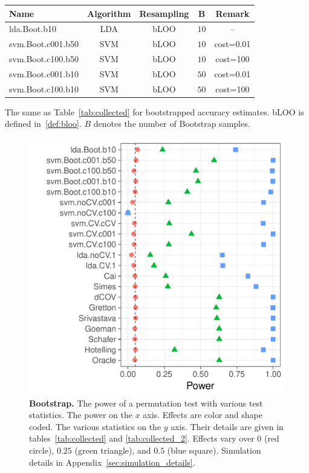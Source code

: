 \documentclass[onecolumn,draftclsnofoot]{IEEEtran}
\begin{document}
\begin{tcolorbox}
	\centering
	\footnotesize
	\begin{tabular}{l|c|c|c|c}
		Name & Algorithm & Resampling & B  & Remark\\ 
		\hline
		\hline
		lda.Boot.b10 & LDA & bLOO 	& $10$ &  -- \\ 
		svm.Boot.c001.b50 & SVM & bLOO 	& $10$ & cost=0.01 \\ 
		svm.Boot.c100.b50 & SVM & bLOO 	& $10$ & cost=100 \\ 
		svm.Boot.c001.b10 & SVM & bLOO 	& $50$ & cost=0.01 \\ 
		svm.Boot.c100.b10 & SVM & bLOO 	& $50$ & cost=100 \\ 
	\end{tabular} 
	\captionsetup{type=table}
	\caption{\footnotesize
		The same as Table~\ref{tab:collected} for bootstrapped accuracy estimates. 
		bLOO is defined in~\ref{def:bloo}.
		$B$ denotes the number of Bootstrap samples.} 
	\label{tab:collected_2}
\end{tcolorbox}


\begin{figure}[ht]
	\centering
	\includegraphics[width=0.7\columnwidth]{"art/file13"}
	\caption{
		\textbf{Bootstrap.}
		The power of a permutation test with various test statistics. 
		The power on the $x$ axis. 
		Effects are color and shape coded. 
		The various statistics on the $y$ axis. 
		Their details are given in tables~\ref{tab:collected} and \ref{tab:collected_2}. 
		Effects vary over $0$ (red circle), $0.25$ (green triangle), and $0.5$ (blue square). 
		Simulation details in Appendix~\ref{sec:simulation_details}.
	} 
	\label{fig:bootstrap}
\end{figure}
\end{document}
